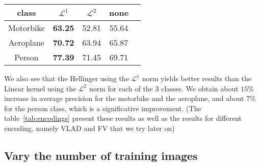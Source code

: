\documentclass{article}
\begin{document}
\begin{table}[h!]
  \centering
  \begin{tabular}{| c | c | c | c | c |}
    \hline
    class & $\mathcal{L}^1$ & $\mathcal{L}^2$ & none \\
    \hline
    Motorbike & \textbf{63.25} & 52.81 & 55.64 \\
    Aeroplane & \textbf{70.72} & 63.94 & 65.87 \\
    Person    & \textbf{77.39} & 71.45 & 69.71 \\
    \hline
  \end{tabular}
   \label{tab:ap-normalization-hellinger}
\end{table}

We also see that the Hellinger using the $\mathcal{L}^1$ norm yields
better results than the Linear kernel using the $\mathcal{L}^2$ norm
for each of the 3 classes. We obtain about $15\%$ increase in average
precision for the motorbike and the aeroplane, and about $7\%$ for the
person class, which is a significative improvement. (The
table~\ref{tab:encodings} present these results as well as the results
for different encoding, namely VLAD and FV that we try later on)


\subsection{Vary the number of training images}
\end{document}
